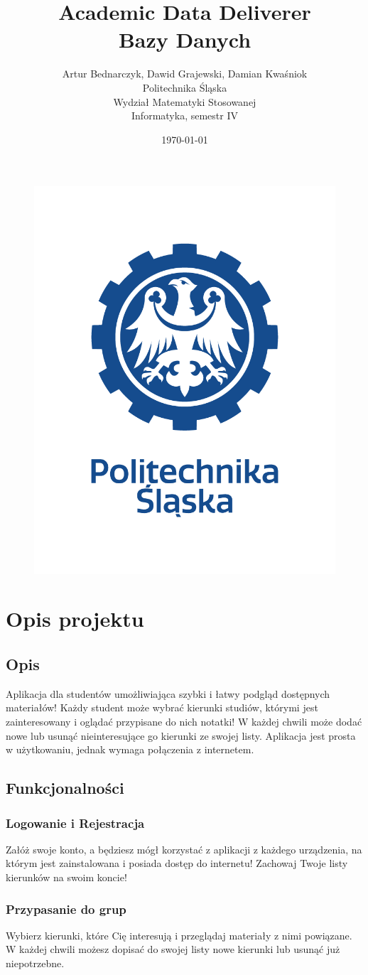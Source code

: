 \documentclass[12pt,a4paper]{article}
\title{Academic Data Deliverer\\Bazy Danych}
\author{Artur Bednarczyk, Dawid Grajewski, Damian Kwaśniok\\Politechnika Śląska\\Wydział Matematyki Stosowanej\\Informatyka, semestr IV}
\date{\today}
\begin{document}
	\maketitle
	\begin{figure}[H]
		\centering
		\includegraphics[width=0.5\linewidth]{LOGO2}
		\label{fig:logo}
	\end{figure}
	\clearpage
	\tableofcontents
	\clearpage
	\section{Opis projektu}
		\subsection{Opis}
			Aplikacja dla studentów umożliwiająca szybki i łatwy podgląd dostępnych materiałów! Każdy student może wybrać kierunki studiów, którymi jest zainteresowany i oglądać przypisane do nich notatki! W każdej chwili  może dodać nowe lub usunąć nieinteresujące go kierunki ze swojej listy. Aplikacja jest prosta w użytkowaniu, jednak wymaga połączenia z internetem.
		\subsection{Funkcjonalności}
			\subsubsection{Logowanie i Rejestracja}
				Załóż swoje konto, a będziesz mógł korzystać z aplikacji z każdego urządzenia, na którym jest zainstalowana i posiada dostęp do internetu! Zachowaj Twoje listy kierunków na swoim koncie!
			\subsubsection{Przypasanie do grup}
				Wybierz kierunki, które Cię interesują i przeglądaj materiały z nimi powiązane. W każdej chwili możesz dopisać do swojej listy nowe kierunki lub usunąć już niepotrzebne.
\end{document}
